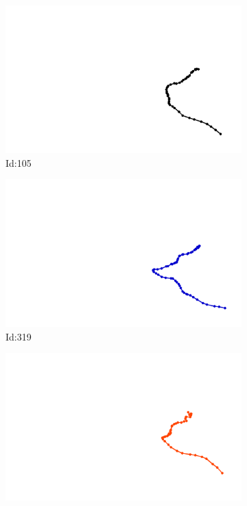\documentclass[12pt,twoside]{report}
\begin{document}
\begin{figure}
\centering
\begin{subfigure}[b]{0.20\textwidth}
\centering
\includegraphics[width=\textwidth]{../../trajectories/105.png}
\caption{Id:105}
\end{subfigure}
\begin{subfigure}[b]{0.20\textwidth}
\centering
\includegraphics[width=\textwidth]{../../trajectories/319.png}
\caption{Id:319}
\end{subfigure}
\begin{subfigure}[b]{0.20\textwidth}
\centering
\includegraphics[width=\textwidth]{../../trajectories/349.png}

\end{subfigure}
\end{figure}
\end{document}
